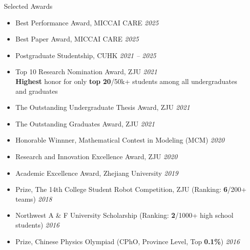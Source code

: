 \documentclass[a4paper]{resume} %
\begin{document}
\begin{rSection}{Selected Awards} 
\begin{itemize}
	\item Best Performance Award,  MICCAI CARE \hfill{\it 2025}
	\item Best Paper Award,  MICCAI CARE \hfill{\it 2025}
	\item Postgraduate Studentship, CUHK \hfill{\it 2021 -- 2025}
	\item Top 10 Research Nomination Award, ZJU \hfill{\it 2021}
	\\ {\bf Highest} honor for only {\bf top 20}/50k+ students among all undergraduates and graduates
	\item The Outstanding Undergraduate Thesis Award, ZJU \hfill{\it 2021}
	\item The Outstanding Graduates Award, ZJU \hfill{\it 2021}
   	\item Honorable Winnner, Mathematical Contest in Modeling (MCM) \hfill{\it 2020}
    	\item Research and Innovation Excellence Award, ZJU \hfill{\it 2020}
 	\item Academic Excellence Award, Zhejiang University \hfill{\it 2019}
 	\item {} Prize, The 14th College Student Robot Competition, ZJU (Ranking: {\bf 6}/200+ teams) \hfill{\it 2018}
 	\item Northwest A \& F University Scholarship (Ranking: {\bf 2}/1000+ high school students) \hfill{\it 2016}
 	\item {} Prize, Chinese Physics Olympiad (CPhO, Province Level, Top {\bf 0.1\%}) \hfill{\it 2016}
\end{itemize}
\end{rSection}









\end{document}
